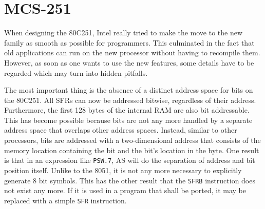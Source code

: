 \documentclass[12pt,twoside]{report}
\newcommand{\tty}[1]{{\tt #1}}
\begin{document}

\section{MCS-251}

When designing the 80C251, Intel really tried to make the move to
the new family as smooth as possible for programmers.  This
culminated in the fact that old applications can run on the new
processor without having to recompile them.  However, as soon as one
wants to use the new features, some details have to be regarded which
may turn into hidden pitfalls.

The most important thing is the absence of a distinct address space
for bits on the 80C251.  All SFRs can now be addressed bitwise,
regardless of their address.  Furthermore, the first 128 bytes of the
internal RAM are also bit addressable.  This has become possible
because bits are not any more handled by a separate address space
that overlaps other address spaces.  Instead, similar to other
processors, bits are addressed with a two-dimensional address that
consists of the memory location containing the bit and the bit's
location in the byte.  One result is that in an expression like
\tty{PSW.7}, AS will do the separation of address and bit position itself.
Unlike to the 8051, it is not any more necessary to explicitly
generate 8 bit symbols.  This has the other result that the \tty{SFRB}
instruction does not exist any more.  If it is used in a program that
shall be ported, it may be replaced with a simple \tty{SFR} instruction.
\end{document}
